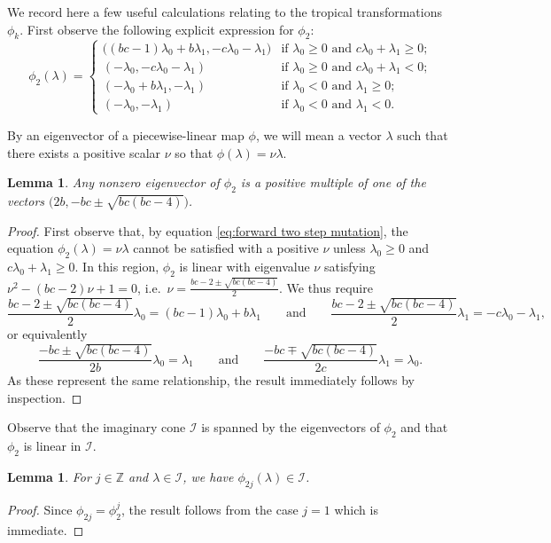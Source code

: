 \documentclass[pdflatex,sn-mathphys]{sn-jnl}%
\theoremstyle{thmstyleone}%
\newtheorem{lemma}[theorem]{Lemma}
\theoremstyle{thmstyletwo}%
\theoremstyle{thmstylethree}%
\newcommand{\cI}{\mathcal{I}}
\newcommand{\ZZ}{\mathbb{Z}}
\begin{document}
  We record here a few useful calculations relating to the tropical transformations $\phi_k$.
  First observe the following explicit expression for $\phi_2$:
  \begin{equation}
    \label{eq:forward two step mutation}
    \phi_2(\lambda)
    =
    \begin{cases}
      \big((bc-1)\lambda_0+b\lambda_1, -c\lambda_0-\lambda_1\big) & \text{if $\lambda_0\ge 0$ and $c\lambda_0+\lambda_1\ge 0$;}\\
      (-\lambda_0, -c\lambda_0-\lambda_1) & \text{if $\lambda_0\ge 0$ and $c\lambda_0+\lambda_1<0$;}\\
      (-\lambda_0+b\lambda_1, -\lambda_1) & \text{if $\lambda_0<0$ and $\lambda_1\ge 0$;}\\
      (-\lambda_0,-\lambda_1) & \text{if $\lambda_0<0$ and $\lambda_1<0$.}
    \end{cases}
  \end{equation}

  By an eigenvector of a piecewise-linear map $\phi$, we will mean a vector $\lambda$ such that there exists a positive scalar $\nu$ so that $\phi(\lambda)=\nu\lambda$.
  \begin{lemma}
    Any nonzero eigenvector of $\phi_2$ is a positive multiple of one of the vectors $\big(2b,-bc\pm\sqrt{bc(bc-4)}\big)\!$.
  \end{lemma}
  \begin{proof}
    First observe that, by equation \eqref{eq:forward two step mutation}, the equation $\phi_2(\lambda)=\nu\lambda$ cannot be satisfied with a positive $\nu$ unless $\lambda_0\ge 0$ and $c\lambda_0+\lambda_1\ge 0$.
    In this region, $\phi_2$ is linear with eigenvalue $\nu$ satisfying $\nu^2-(bc-2)\nu+1=0$, i.e.~$\nu=\frac{bc-2\pm\sqrt{bc(bc-4)}}{2}$.
    We thus require 
    \[\frac{bc-2\pm\sqrt{bc(bc-4)}}{2}\lambda_0=(bc-1)\lambda_0+b\lambda_1 \qquad\text{and}\qquad \frac{bc-2\pm\sqrt{bc(bc-4)}}{2}\lambda_1= -c\lambda_0-\lambda_1,\]
    or equivalently
    \[\frac{-bc\pm\sqrt{bc(bc-4)}}{2b}\lambda_0=\lambda_1 \qquad\text{and}\qquad \frac{-bc\mp\sqrt{bc(bc-4)}}{2c}\lambda_1=\lambda_0.\]
    As these represent the same relationship, the result immediately follows by inspection.
  \end{proof}

  Observe that the imaginary cone $\cI$ is spanned by the eigenvectors of $\phi_{2}$ and that $\phi_{2}$ is linear in $\cI$.
  \begin{lemma}
    \label{le:imaginary stability}
    For $j\in\ZZ$ and $\lambda\in\cI$, we have $\phi_{2j}(\lambda)\in\cI$.
  \end{lemma}
  \begin{proof}
    Since $\phi_{2j}=\phi_2^j$, the result follows from the case $j=1$ which is immediate.
  \end{proof}
\end{document}
